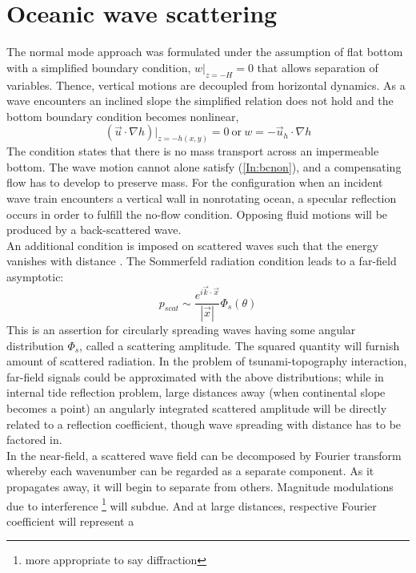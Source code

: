 \documentclass[12pt]{article}
\begin{document}
\section{Oceanic wave scattering}
The normal mode approach was formulated under the assumption of flat bottom with a simplified 
boundary condition, $w|_{z = -H} = 0$ that allows separation of variables. Thence, 
vertical motions are decoupled from horizontal dynamics. As a wave encounters an inclined 
slope the simplified relation does not hold and the bottom boundary condition becomes nonlinear,
\begin{equation}
( \vec{u} \cdot \nabla h )|_{z = -h(x, y)} = 0~\text{or}~w = - \vec{u}_h \cdot \nabla h 
\label{In:bcnon} 
\end{equation}
The condition states that there is no mass transport across an impermeable bottom. The wave motion 
cannot alone satisfy (\ref{In:bcnon}), and a compensating flow has to develop to preserve mass. For 
the configuration when an incident wave train encounters a vertical wall in nonrotating ocean, a 
specular reflection occurs in order to fulfill the no-flow condition. Opposing fluid motions 
will be produced by a back-scattered wave.\\
An additional condition is imposed on scattered waves such that the energy vanishes with distance 
\citep{mei1989theory, morse1946methods}. The Sommerfeld radiation condition leads to  
a far-field asymptotic:
\begin{equation}
\label{In:def.scamp}
p_{scat} \sim \frac{e^{i \vec{k} \cdot \vec{x}}}{|\vec{x}|} \Phi_s (\theta)
\end{equation}
This is an assertion for circularly spreading waves having some angular distribution $\Phi_s$, 
called a scattering amplitude. The squared quantity will furnish amount of scattered radiation. In 
the problem of tsunami-topography interaction, far-field signals could be approximated with the 
above distributions; while in internal tide reflection problem, large distances away (when 
continental slope becomes a point) an angularly integrated scattered amplitude will be directly 
related to a reflection coefficient, though wave spreading with distance has to be factored in.\\
In the near-field, a scattered wave field can be decomposed by Fourier transform whereby each 
wavenumber can be regarded as a separate component. As it propagates away, it will begin to 
separate from others. Magnitude modulations due to interference \footnote{more appropriate to say 
diffraction} will subdue. And at large distances, respective Fourier coefficient will represent a 
\end{document}
